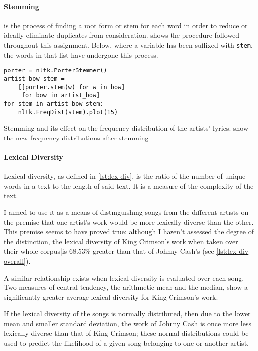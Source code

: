 \paragraph{Stemming} is the process of finding a root form or stem for each word in order to reduce or ideally eliminate duplicates from consideration.  shows the procedure followed throughout this assignment. Below, where a variable has been suffixed with \texttt{\textunderscore stem}, the words in that list have undergone this process.
\begin{listing}[h]
\begin{verbatim}
porter = nltk.PorterStemmer()
artist_bow_stem = 
	[[porter.stem(w) for w in bow]
	 for bow in artist_bow]
for stem in artist_bow_stem:
	nltk.FreqDist(stem).plot(15)
	\end{verbatim}
	\caption{Stemming and its effect on the frequency distribution of the artists' lyrics.  show the new frequency distributions after stemming.}
	\label{lst:stemming}
\end{listing}

\paragraph{Lexical Diversity}

Lexical diversity, as defined in \cref{lst:lex div}, is the ratio of the number of unique words in a text to the length of said text. It is a measure of the complexity of the text.

I aimed to use it as a means of distinguishing songs from the different artists on the premise that one artist's work would be more lexically diverse than the other. This premise seems to have proved true: although I haven't assessed the degree of the distinction, the lexical diversity of King Crimson's work|when taken over their whole corpus|is 68.53\% greater than that of Johnny Cash's (see \cref{lst:lex div overall}).

A similar relationship exists when lexical diversity is evaluated over each song. Two measures of central tendency, the arithmetic mean and the median, show a significantly greater average lexical diversity for King Crimson's work.

If the lexical diversity of the songs is normally distributed, then due to the lower mean and smaller standard deviation, the work of Johnny Cash is once more less lexically diverse than that of King Crimson; these normal distributions could be used to predict the likelihood of a given song belonging to one or another artist.

